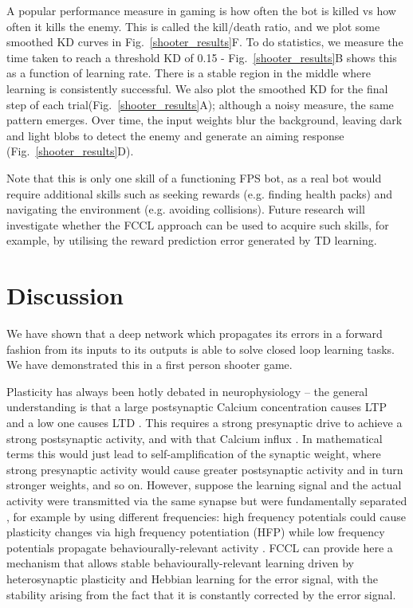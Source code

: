 \documentclass[Afour,sageh,times]{sagej}
\begin{document}
A popular performance measure in gaming is how often the bot is killed
vs how often it kills the enemy. This is called the kill/death ratio,
and we plot some smoothed KD curves in Fig.~\ref{shooter_results}F. To
do statistics, we measure the time taken to reach a threshold KD of
0.15 - Fig.~\ref{shooter_results}B shows this as a function of
learning rate. There is a stable region in the middle where
learning is consistently successful. We also plot the smoothed KD for
the final step of each trial(Fig.~\ref{shooter_results}A); although a
noisy measure, the same pattern emerges. Over time, the input weights
blur the background, leaving dark and light blobs to detect the enemy
and generate an aiming response (Fig.~\ref{shooter_results}D).

Note that this is only one skill of a functioning FPS bot, as a real
bot would require additional skills such as seeking rewards
(e.g. finding health packs) and navigating the environment
(e.g. avoiding collisions). Future research will investigate whether
the FCCL approach can be used to acquire such skills, for example,
by utilising the reward prediction error generated by TD learning.


\section{Discussion}
We have shown that a deep network which propagates its errors in a
forward fashion from its inputs to its outputs is able to solve closed
loop learning tasks. We have demonstrated this in a first person
shooter game.

Plasticity has always been hotly debated in neurophysiology -- the
general understanding is that a large postsynaptic Calcium
concentration causes LTP \cite{Malenka99,Bennett2000} and a low one
causes LTD \cite{Mulkey1992}. This requires a strong presynaptic drive
to achieve a strong postsynaptic activity, and with that Calcium
influx \cite{Meunier2017}. In mathematical terms this would just lead
to self-amplification of the synaptic weight, where strong presynaptic
activity would cause greater postsynaptic activity and in turn
stronger weights, and so on. However, suppose the learning signal and
the actual activity were transmitted via the same synapse but were
fundamentally separated \cite{Lindsay2017}, for example by using
different frequencies: high frequency potentials could cause
plasticity changes via high frequency potentiation (HFP) while low
frequency potentials propagate behaviourally-relevant activity
\cite{Canolty2010}. FCCL can provide here a mechanism that allows
stable behaviourally-relevant learning driven by heterosynaptic
plasticity and Hebbian learning for the error signal, with the
stability arising from the fact that it is constantly corrected by the
error signal.
\end{document}
